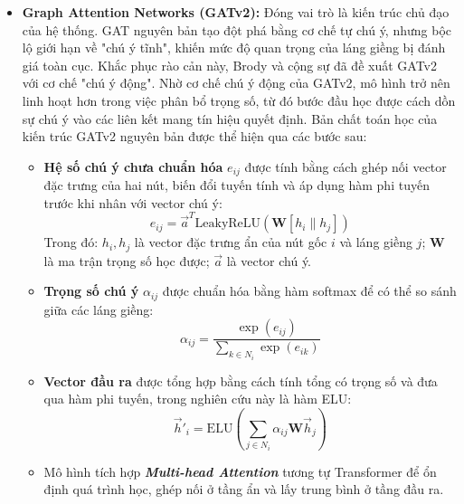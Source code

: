 \begin{itemize}[label={--}, itemsep=5pt]
    \item \textbf{Graph Attention Networks (GATv2):} Đóng vai trò là kiến trúc chủ đạo của hệ thống. GAT nguyên bản \cite{velickovic2017graph} tạo đột phá bằng cơ chế tự chú ý, nhưng bộc lộ giới hạn về "chú ý tĩnh", khiến mức độ quan trọng của láng giềng bị đánh giá toàn cục. Khắc phục rào cản này, Brody và cộng sự \cite{brody2021attentive} đã đề xuất GATv2 với cơ chế "chú ý động". Nhờ cơ chế chú ý động của GATv2, mô hình trở nên linh hoạt hơn trong việc phân bổ trọng số, từ đó bước đầu học được cách dồn sự chú ý vào các liên kết mang tín hiệu quyết định. Bản chất toán học của kiến trúc GATv2 nguyên bản được thể hiện qua các bước sau:
    \begin{itemize}[label={+}, itemsep=2pt]
        \item \textbf{Hệ số chú ý chưa chuẩn hóa} $e_{ij}$ được tính bằng cách ghép nối vector đặc trưng của hai nút, biến đổi tuyến tính và áp dụng hàm phi tuyến trước khi nhân với vector chú ý:
        \[
            e_{ij} = \vec{a}^T \text{LeakyReLU}\left( \mathbf{W} [h_i \| h_j] \right)
        \]
        Trong đó: $h_i, h_j$ là vector đặc trưng ẩn của nút gốc $i$ và láng giềng $j$; $\mathbf{W}$ là ma trận trọng số học được; $\vec{a}$ là vector chú ý.
        
        \item \textbf{Trọng số chú ý} $\alpha_{ij}$ được chuẩn hóa bằng hàm softmax để có thể so sánh giữa các láng giềng:
        \[
            \alpha_{ij} = \frac{\exp(e_{ij})}{\sum_{k \in N_i} \exp(e_{ik})}
        \]
        
        \item \textbf{Vector đầu ra} được tổng hợp bằng cách tính tổng có trọng số và đưa qua hàm phi tuyến, trong nghiên cứu này là hàm ELU:
        \[
            \vec{h}'_i = \text{ELU} \left( \sum_{j \in N_i} \alpha_{ij} \mathbf{W}\vec{h}_j \right)
        \]
        
        \item Mô hình tích hợp \textbf{\textit{Multi-head Attention}} tương tự Transformer \cite{vaswani2017attention} để ổn định quá trình học, ghép nối ở tầng ẩn và lấy trung bình ở tầng đầu ra.
    \end{itemize}


\end{itemize}
